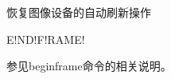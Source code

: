 \label{cmd:endframe}

恢复图像设备的自动刷新操作

\begin{SACSTX}
E!ND!F!RAME!
\end{SACSTX}

参见beginframe命令的相关说明。

